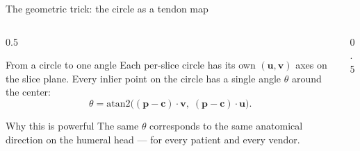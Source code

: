 \begin{frame}{The geometric trick: the circle as a tendon map}
  \begin{columns}[T]
    \begin{column}{0.5\textwidth}
      \begin{block}{From a circle to one angle}
        Each per-slice circle has its own \alert{$(\mathbf{u},\mathbf{v})$ axes} on the slice plane.
        Every inlier point on the circle has a single angle $\theta$ around the center:
        \[
          \theta = \mathrm{atan2}\big((\mathbf{p}-\mathbf{c})\!\cdot\!\mathbf{v},\; (\mathbf{p}-\mathbf{c})\!\cdot\!\mathbf{u}\big).
        \]
      \end{block}
      \begin{block}{Why this is powerful}
        The same $\theta$ corresponds to the \alert{same anatomical direction} on the humeral head --- for every patient and every vendor.
      \end{block}
    \end{column}
    \begin{column}{0.5\textwidth}
      \centering
    \end{column}
  \end{columns}
\end{frame}

